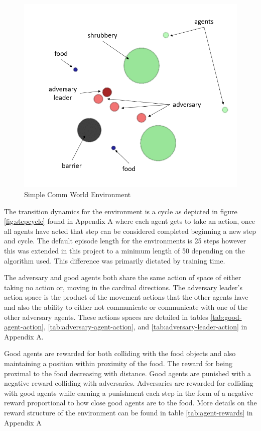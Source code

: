 \documentclass{article}
\begin{document}
\begin{figure}[!ht]
  \centering
  \includegraphics[scale=0.25]{simple_comm_environment.png}
  \caption{Simple Comm World Environment}
  \label{fig:simple_comm_world}
\end{figure}


The transition dynamics for the environment is a cycle as depicted in figure \ref{fig:stepcycle} found in Appendix A where each agent gets to take an action, once all agents have acted that step can be considered completed beginning a new step and cycle.
The default episode length for the environments is 25 steps however this was extended in this project to a minimum length of 50 depending on the algorithm used. 
This difference was primarily dictated by training time.

The adversary and good agents both share the same action of space of either taking no action or, moving in the cardinal directions.
The adversary leader's action space is the product of the movement actions that the other agents have and also the ability to either not communicate or communicate with one of the other adversary agents.
These actions spaces are detailed in tables \ref{tab:good-agent-action}, \ref{tab:adversary-agent-action}, and \ref{tab:adversary-leader-action} in Appendix A.

Good agents are rewarded for both colliding with the food objects and also maintaining a position within proximity of the food.
The reward for being proximal to the food decreasing with distance.
Good agents are punished with a negative reward colliding with adversaries.
Adversaries are rewarded for colliding with good agents while earning a punishment each step in the form of a negative reward proportional to how close good agents are to the food.
More details on the reward structure of the environment can be found in table \ref{tab:agent-rewards} in Appendix A
\end{document}
